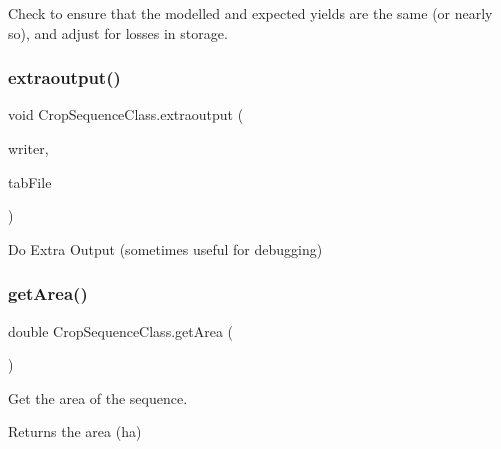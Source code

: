 Check to ensure that the modelled and expected yields are the same (or nearly so), and adjust for losses in storage. 

\mbox{\label{class_crop_sequence_class_a280225949ad2e165a2106fed4a681958}} 
\subsubsection{\texorpdfstring{extraoutput()}{extraoutput()}}
{\footnotesize\ttfamily void Crop\+Sequence\+Class.\+extraoutput (\begin{DoxyParamCaption}\item[{Xml\+Writer}]{writer,  }\item[{System.\+I\+O.\+Stream\+Writer}]{tab\+File }\end{DoxyParamCaption})\hspace{0.3cm}{\ttfamily [inline]}}



Do Extra Output (sometimes useful for debugging) 

\mbox{\label{class_crop_sequence_class_aa8158757aaa97946f03d91b39a2b597e}} 
\subsubsection{\texorpdfstring{getArea()}{getArea()}}
{\footnotesize\ttfamily double Crop\+Sequence\+Class.\+get\+Area (\begin{DoxyParamCaption}{ }\end{DoxyParamCaption})\hspace{0.3cm}{\ttfamily [inline]}}



Get the area of the sequence. 

\begin{DoxyReturn}{Returns}
the area (ha) 
\end{DoxyReturn}
\mbox{\label{class_crop_sequence_class_ab6555a4ed0e9a6b4527e90938d10c61f}} 
